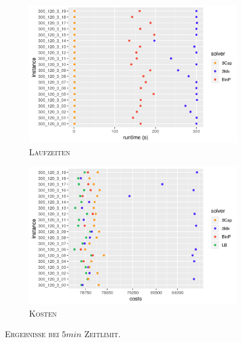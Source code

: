 \begin{figure}[H]
\centering
\begin{subfigure}[b]{0.47\textwidth}
\centering
\includegraphics[width=1.1\textwidth]{img/solver_instance_time_b=3_m_300s.png}
\caption{\textsc{Laufzeiten}}
\label{fig:b=3_m_runtimes}
\end{subfigure}
\hfill
\begin{subfigure}[b]{0.47\textwidth}
\centering
\includegraphics[width=1.1\textwidth]{img/solver_instance_cost_b=3_m_300s.png}
\caption{\textsc{Kosten}}
\label{fig:b=3_m_costs}
\end{subfigure}
\caption{\textsc{Ergebnisse bei $5min$ Zeitlimit}.}
\end{figure}

